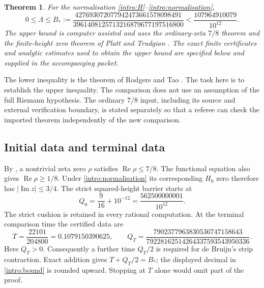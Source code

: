 \documentclass[11pt,a4paper]{article}
\newtheorem{theorem}{Theorem}[section]
\theoremstyle{definition}
\theoremstyle{remark}
\newcommand{\Ree}{\operatorname{Re}}
\newcommand{\Imm}{\operatorname{Im}}
\begin{document}
\begin{theorem}\label{intro:theorem}
For the normalisation \eqref{intro:H}--\eqref{intro:normalisation},
\begin{equation}\label{intro:bound}
 0\le\Lambda\le B_*:=
 \frac{427693072077942473661578098491}
 {3961408125713216879677197516800}
 <\frac{107964910079}{10^{12}}.
\end{equation}
The upper bound is computer assisted and uses the ordinary-zeta
$7/8$ theorem \cite{OAI:The-Quasi-Riemann-Hypothesis-September-30-2026} and the finite-height zero theorem of
Platt and Trudgian \cite{PlattTrudgian}. The exact finite certificates
and analytic estimates used to obtain the upper bound are specified
below and supplied in the accompanying packet.
\end{theorem}

The lower inequality is the theorem of Rodgers and Tao
\cite{RodgersTao}. The task here is to establish the upper inequality.
The comparison does not use an assumption of the full Riemann hypothesis.
The ordinary $7/8$ input, including its source and external verification
boundary, is stated separately so that a referee can check the imported
theorem independently of the new comparison.

\subsection{Initial data and terminal data}
By \cite{OAI:The-Quasi-Riemann-Hypothesis-September-30-2026}, a nontrivial zeta zero $\rho$ satisfies
$\Ree\rho\le7/8$. The functional equation also gives
$\Ree\rho\ge1/8$. Under \eqref{intro:normalisation} its corresponding
$H_0$ zero therefore has $|\Imm z|\le3/4$. The strict squared-height
barrier starts at
\begin{equation}\label{intro:q0}
 Q_0=\frac9{16}+10^{-12}
     =\frac{562500000001}{10^{12}}.
\end{equation}
The strict cushion is retained in every rational computation. At the
terminal comparison time the certified data are
\begin{equation}\label{intro:terminal}
 T=\frac{22101}{204800}=0.1079150390625,
 \qquad
 Q_T=\frac{7902377963830536747158643}
 {79228162514264337593543950336}.
\end{equation}
Here $Q_T>0$. Consequently a further time $Q_T/2$ is required for
de Bruijn's strip contraction. Exact addition gives
$T+Q_T/2=B_*$; the displayed decimal in
\eqref{intro:bound} is rounded upward. Stopping at $T$ alone would
omit part of the proof.
\end{document}

